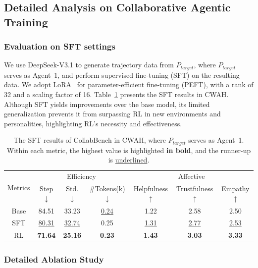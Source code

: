 \documentclass{article}
\theoremstyle{plain}
\theoremstyle{definition}
\theoremstyle{remark}
\begin{document}
\subsection{Detailed Analysis on Collaborative Agentic Training}\label{appx:ablation}
\subsubsection{Evaluation on SFT settings}
We use DeepSeek-V3.1 to generate trajectory data from $P_{target}$, where $P_{target}$ serves as Agent~1, and perform supervised fine-tuning (SFT) on the resulting data. We adopt LoRA~\cite{Lora} for parameter-efficient fine-tuning (PEFT), with a rank of 32 and a scaling factor of 16. Table~\ref{apx:tab:sft} presents the SFT results in CWAH. Although SFT yields improvements over the base model, its limited generalization prevents it from surpassing RL in new environments and personalities, highlighting RL's necessity and effectiveness.
\begin{table}[htbp]
  \centering
  \caption{The SFT results of CollabBench in CWAH, where $P_{target}$ serves as Agent~1. Within each metric, the highest value is highlighted \textbf{in bold}, and the runner-up is \underline{underlined}.}
    \begin{tabular}{c|ccc|ccc}
    \toprule
    \multirow{2}[2]{*}{Metrics} & \multicolumn{3}{c|}{Efficiency} & \multicolumn{3}{c}{Affective} \\
          & Step $\downarrow$ & Std. $\downarrow$  & \#Tokens(k) $\downarrow$ & Helpfulness $\uparrow$ & Trustfulness $\uparrow$ & Empathy $\uparrow$ \\
    \midrule
    Base  & 84.51 & 33.23 & \underline{0.24}  & 1.22  & 2.58  & 2.50  \\
    SFT   & \underline{80.31} & \underline{32.74} & 0.25  & \underline{1.31}  & \underline{2.77}  & \underline{2.53} \\
    RL    & \textbf{71.64} & \textbf{25.16} & \textbf{0.23} & \textbf{1.43} & \textbf{3.03} & \textbf{3.33} \\
    \bottomrule
    \end{tabular}%
  \label{apx:tab:sft}%
\end{table}%

\subsubsection{Detailed Ablation Study}
\end{document}
